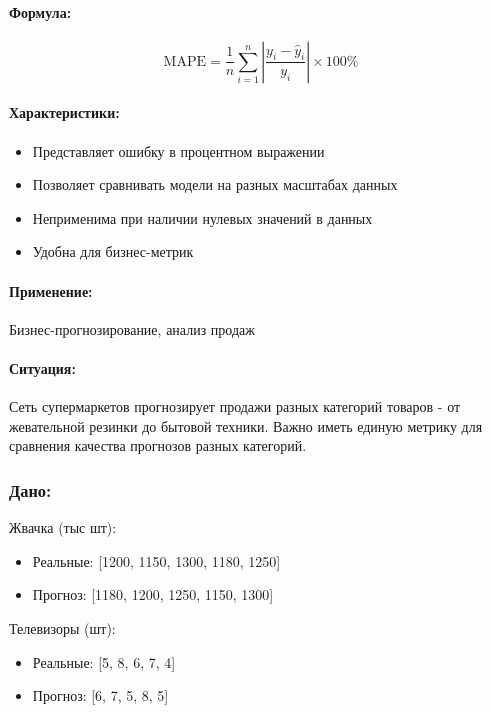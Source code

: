 \paragraph{Формула:}
\[
    \text{MAPE} = \frac{1}{n} \sum_{i=1}^{n} \left|\frac{y_i - \hat{y}_i}{y_i}\right| \times 100\%
\]

\paragraph{Характеристики:}
\begin{itemize}
    \item Представляет ошибку в процентном выражении
    \item Позволяет сравнивать модели на разных масштабах данных
    \item Неприменима при наличии нулевых значений в данных
    \item Удобна для бизнес-метрик
\end{itemize}

\paragraph{Применение:} Бизнес-прогнозирование, анализ продаж

\paragraph{Ситуация:} Сеть супермаркетов прогнозирует продажи разных категорий товаров - от жевательной резинки до бытовой техники. Важно иметь единую метрику для сравнения качества прогнозов разных категорий.

\subsubsection*{Дано:}

Жвачка (тыс шт):
\begin{itemize}
    \item Реальные: [1200, 1150, 1300, 1180, 1250]
    \item Прогноз: [1180, 1200, 1250, 1150, 1300]
\end{itemize}

Телевизоры (шт):
\begin{itemize}
    \item Реальные: [5, 8, 6, 7, 4]
    \item Прогноз: [6, 7, 5, 8, 5]
\end{itemize}

